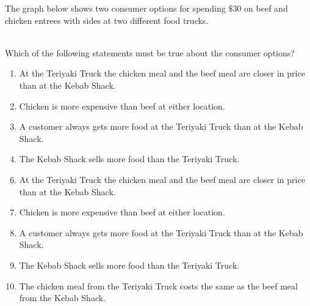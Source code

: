  
The graph below shows two consumer options for spending $\$30$ on beef and chicken entrees with sides at two different food trucks.  \\\\
\begin{center} \end{center}
Which of the following statements must be true about the consumer options?


\ifsat
	\begin{enumerate}[label=\Alph*)]
		\item At the Teriyaki Truck the chicken meal and the beef meal are closer in price than at the Kebab Shack.
		\item Chicken is more expensive than beef at either location. %
		\item A customer always gets more food at the Teriyaki Truck than at the Kebab Shack.
		\item The Kebab Shack sells more food than the Teriyaki Truck.
	\end{enumerate}
\else
\fi

\ifacteven
	\begin{enumerate}[label=\textbf{\Alph*.},itemsep=\fill,align=left]
		\setcounter{enumii}{5}
		\item At the Teriyaki Truck the chicken meal and the beef meal are closer in price than at the Kebab Shack.
		\item Chicken is more expensive than beef at either location. %
		\item A customer always gets more food at the Teriyaki Truck than at the Kebab Shack.
		\addtocounter{enumii}{1}
		\item The Kebab Shack sells more food than the Teriyaki Truck.
		\item The chicken meal from the Teriyaki Truck costs the same as the beef meal from the Kebab Shack.
	\end{enumerate}
\else
\fi

